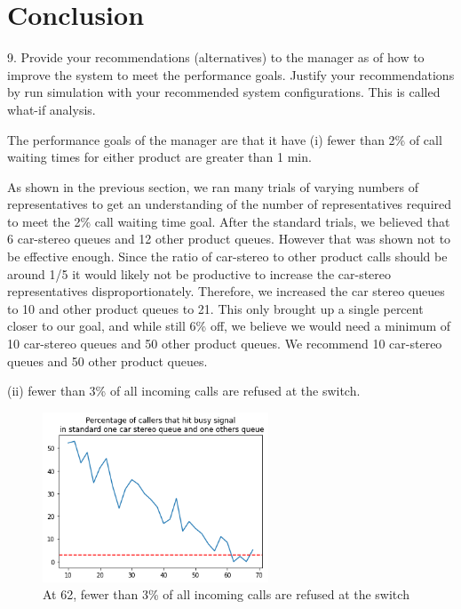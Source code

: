 \documentclass{article}
\begin{document}
\section{Conclusion}
9. Provide your recommendations (alternatives) to the manager as of how to improve the system to meet the performance goals. Justify your recommendations by run simulation with your recommended system configurations. This is called what-if analysis. \\
\par
The performance goals of the manager are that it have (i) fewer than 2\% of call waiting times for either product are greater than 1 min.\\
\par
As shown in the previous section, we ran many trials of varying numbers of representatives to get an understanding of the number of representatives required to meet the 2\% call waiting time goal. After the standard trials, we believed that 6 car-stereo queues and 12 other product queues. However that was shown not to be effective enough. Since the ratio of car-stereo to other product calls should be around 1/5 it would likely not be productive to increase the car-stereo representatives disproportionately. Therefore, we increased the car stereo queues to 10 and other product queues to 21. This only brought up a single percent closer to our goal, and while still 6\% off, we believe we would need a minimum of 10 car-stereo queues and 50 other product queues. We recommend 10 car-stereo queues and 50 other product queues.


(ii) fewer than 3\% of all incoming calls are refused at the switch.

\begin{figure}[h]
\centering
\includegraphics[width=0.6\textwidth]{standard_per_callers.png}
\caption{At 62, fewer than 3\% of all incoming calls are refused at the switch}
\label{fig:spc}
\end{figure}
\end{document}
